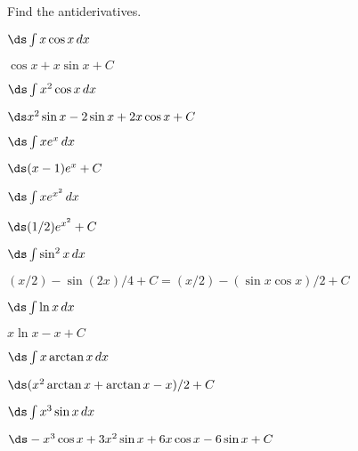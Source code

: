 \begin{exercises}

Find the antiderivatives.

\twocol

\begin{exercise} $\ds\int x\cos x\,dx$
\begin{answer} $\cos x+x\sin x+C$
\end{answer}\end{exercise}

\begin{exercise} $\ds\int x^2\cos x\,dx$
\begin{answer} $\ds x^2\sin x-2 \sin x+2x\cos x +C$
\end{answer}\end{exercise}

\begin{exercise} $\ds\int xe^x\,dx$
\begin{answer} $\ds (x-1)e^x +C$
\end{answer}\end{exercise}

\begin{exercise} $\ds\int xe^{x^2}\,dx$
\begin{answer} $\ds (1/2)e^{x^2} +C$
\end{answer}\end{exercise}

\begin{exercise} $\ds\int \sin^2 x\,dx$
\begin{answer} $(x/2)-\sin(2x)/4 +C=$\hfill\break$(x/2)-(\sin x\cos x)/2+C$
\end{answer}\end{exercise}

\begin{exercise} $\ds\int \ln x\,dx$
\begin{answer} $x\ln x-x +C$
\end{answer}\end{exercise}

\begin{exercise} $\ds\int x\arctan x\,dx$
\begin{answer} $\ds (x^2\arctan x +\arctan x -x)/2+C$
\end{answer}\end{exercise}

\begin{exercise} $\ds\int x^3\sin x\,dx$
\begin{answer} $\ds -x^3\cos x+3x^2\sin x+6x\cos x-6\sin x+C$
\end{answer}\end{exercise}


\end{exercises}
